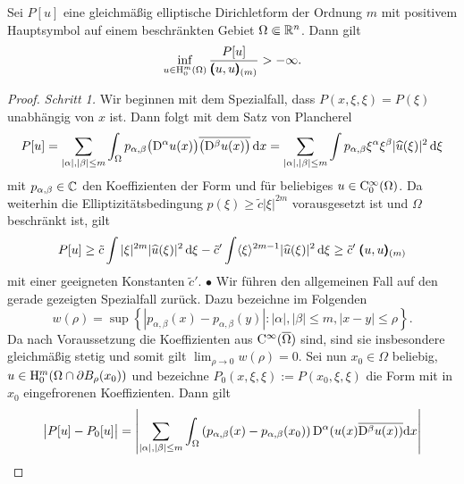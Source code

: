 \begin{thm}
Sei $P[u]$ eine gleichmäßig elliptische Dirichletform der Ordnung $m$ mit positivem Hauptsymbol auf einem beschränkten Gebiet $\Omega\Subset\mathbb R^n$. Dann gilt
\begin{equation}
  \inf_{u\in\mathrm H_0^m(\Omega)} \frac{P[u]}{\pmb(u,u\pmb)_{(m)}} > -\infty.
\end{equation}
\end{thm}
\begin{proof}
{\sl Schritt 1.} Wir beginnen mit dem Spezialfall, dass $P(x,\xi,\xi) = P(\xi)$ unabhängig von $x$ ist. Dann folgt mit dem Satz von Plancherel
\begin{equation}
 P[u] =  \sum_{|\alpha|,|\beta|\le m} \int_\Omega  p_{\alpha,\beta} \big(\mathrm D^\alpha u(x)\big)\overline{\big(\mathrm D^\beta u(x)\big)} \,\mathrm d x
 =   \sum_{|\alpha|,|\beta|\le m} \int  p_{\alpha,\beta} \xi^\alpha \xi^\beta  |\widehat u(\xi)|^2 \,\mathrm d\xi 
\end{equation}
mit $p_{\alpha,\beta}\in\mathbb C$ den Koeffizienten der Form und für beliebiges $u\in\mathrm C_0^\infty(\Omega)$. Da weiterhin die Elliptizitätsbedingung $p(\xi)\ge \tilde c |\xi|^{2m}$ 
vorausgesetzt ist und $\Omega$ beschränkt ist, gilt
\begin{equation}
  P[u] \ge \tilde c \int |\xi|^{2m} |\widehat u(\xi)|^2 \,\mathrm d\xi  -  \tilde c' \int \langle \xi\rangle^{2m-1} |\widehat u(\xi)|^2 \,\mathrm d\xi  \ge  \tilde c'\; \pmb(u,u\pmb)_{(m)}
\end{equation}
mit einer geeigneten Konstanten $\tilde c'$. $\bullet$  Wir führen den allgemeinen Fall auf den gerade gezeigten Spezialfall zurück. Dazu bezeichne im Folgenden
\begin{equation}
	w(\rho) = \sup\left\{| p_{\alpha,\beta}(x)-p_{\alpha,\beta}(y)| : |\alpha|, |\beta| \le m, | x-y| \le \rho\right\}.
\end{equation} 
Da nach Voraussetzung die Koeffizienten aus $\mathrm C^\infty(\overline\Omega)$ sind, sind sie insbesondere gleichmäßig stetig und somit gilt
$\lim_{\rho\to0} w(\rho)=0$.  Sei nun $x_0\in \Omega$ beliebig, $u\in \mathrm H_0^m(\Omega\cap \partial B_\rho(x_0))$ und bezeichne $P_0(x,\xi, \xi):=P(x_0,\xi,\xi)$ die Form mit in $x_0$ eingefrorenen Koeffizienten. Dann gilt
\begin{equation}
\begin{split}
\big| P[u]-P_0[u] \big| &=\left| \sum\limits_{|\alpha|, |\beta| \le m} \int_\Omega \left(p_{\alpha,\beta}(x)-p_{\alpha,\beta}(x_0)\right){\D^\alpha(u(x)}\overline{\D^\beta u(x))}\mathrm{d}x\right|\\

\end{split}
\end{equation}
\end{proof}
